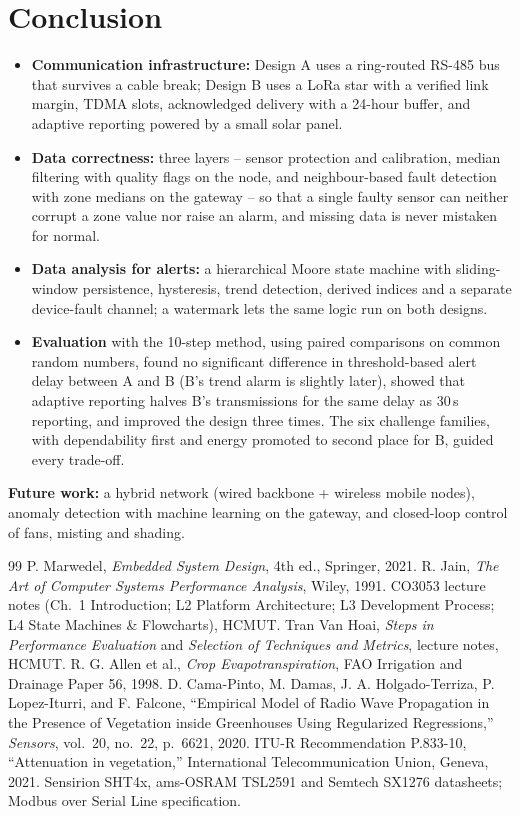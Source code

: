 \documentclass[11pt,a4paper]{report}
\begin{document}
\chapter{Conclusion}\label{ch:concl}
\begin{itemize}
  \item \textbf{Communication infrastructure:} Design A uses a ring-routed RS-485 bus that survives a cable break; Design B uses a LoRa star with a verified link margin, TDMA slots, acknowledged delivery with a 24-hour buffer, and adaptive reporting powered by a small solar panel.
  \item \textbf{Data correctness:} three layers -- sensor protection and calibration, median filtering with quality flags on the node, and neighbour-based fault detection with zone medians on the gateway -- so that a single faulty sensor can neither corrupt a zone value nor raise an alarm, and missing data is never mistaken for normal.
  \item \textbf{Data analysis for alerts:} a hierarchical Moore state machine with sliding-window persistence, hysteresis, trend detection, derived indices and a separate device-fault channel; a watermark lets the same logic run on both designs.
  \item \textbf{Evaluation} with the 10-step method, using paired comparisons on common random numbers, found no significant difference in threshold-based alert delay between A and B (B's trend alarm is slightly later), showed that adaptive reporting halves B's transmissions for the same delay as 30\,s reporting, and improved the design three times. The six challenge families, with dependability first and energy promoted to second place for B, guided every trade-off.
\end{itemize}
\textbf{Future work:} a hybrid network (wired backbone + wireless mobile nodes), anomaly detection with machine learning on the gateway, and closed-loop control of fans, misting and shading.

\begin{thebibliography}{99}
 P. Marwedel, \emph{Embedded System Design}, 4th ed., Springer, 2021.
 R. Jain, \emph{The Art of Computer Systems Performance Analysis}, Wiley, 1991.
 CO3053 lecture notes (Ch.~1 Introduction; L2 Platform Architecture; L3 Development Process; L4 State Machines \& Flowcharts), HCMUT.
 Tran Van Hoai, \emph{Steps in Performance Evaluation} and \emph{Selection of Techniques and Metrics}, lecture notes, HCMUT.
 R. G. Allen et al., \emph{Crop Evapotranspiration}, FAO Irrigation and Drainage Paper 56, 1998.
 D. Cama-Pinto, M. Damas, J. A. Holgado-Terriza, P. Lopez-Iturri, and F. Falcone, ``Empirical Model of Radio Wave Propagation in the Presence of Vegetation inside Greenhouses Using Regularized Regressions,'' \emph{Sensors}, vol.~20, no.~22, p.~6621, 2020.
 ITU-R Recommendation P.833-10, ``Attenuation in vegetation,'' International Telecommunication Union, Geneva, 2021.
 Sensirion SHT4x, ams-OSRAM TSL2591 and Semtech SX1276 datasheets; Modbus over Serial Line specification.
\end{thebibliography}
\end{document}
